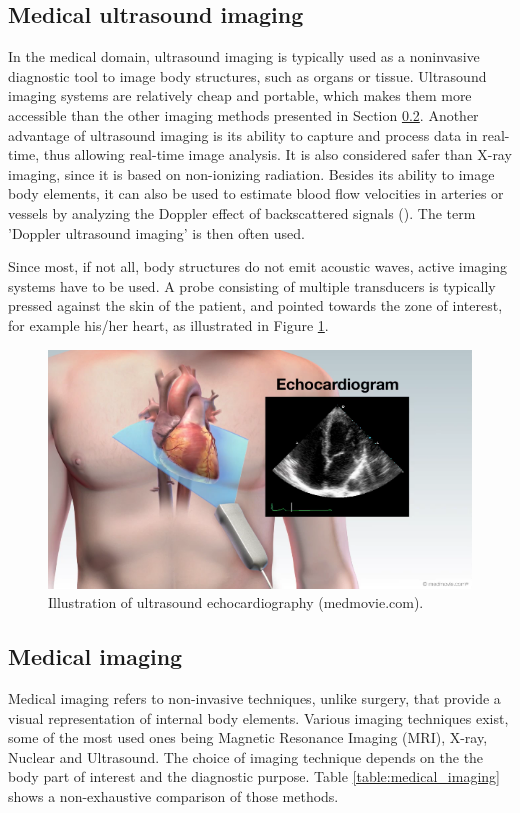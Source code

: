 \subsection{Medical ultrasound imaging}
In the medical domain, ultrasound imaging is typically used as a noninvasive diagnostic tool to image body structures, such as organs or tissue. Ultrasound imaging systems are relatively cheap and portable, which makes them more accessible than the other imaging methods presented in Section \ref{sec:medical_imaging}.
Another advantage of ultrasound imaging is its ability to capture and process data in real-time, thus allowing real-time image analysis.
It is also considered safer than X-ray imaging, since it is based on non-ionizing radiation.
Besides its ability to image body elements, it can also be used to estimate blood flow velocities in arteries or vessels by analyzing the Doppler effect of backscattered signals (\cite{doppler_ultrasound}). The term 'Doppler ultrasound imaging' is then often used.

Since most, if not all, body structures do not emit acoustic waves, active imaging systems have to be used. A probe consisting of multiple transducers is typically pressed against the skin of the patient, and pointed towards the zone of interest, for example his/her heart, as illustrated in Figure \ref{fig:echocardiography}.

\begin{figure}[ht]
    \includegraphics[width=\linewidth]{./images/background/echocardiogram.png}
	\caption[Illustration of ultrasound echocardiography.]{Illustration of ultrasound echocardiography (medmovie.com).}
	\label{fig:echocardiography}
\end{figure}

\subsection{Medical imaging}
\label{sec:medical_imaging}
Medical imaging refers to non-invasive techniques, unlike surgery, that provide a visual representation of internal body elements. Various imaging techniques exist, some of the most used ones being Magnetic Resonance Imaging (MRI), X-ray, Nuclear and Ultrasound. 
The choice of imaging technique depends on the the body part of interest and the diagnostic purpose. Table \ref{table:medical_imaging} shows a non-exhaustive comparison of those methods.

